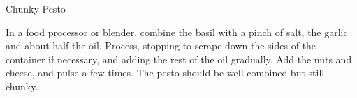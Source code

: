 \begin{recipe}{Chunky Pesto}
    \label{chunky_pesto}

    \begin{ingredients}
    \end{ingredients}

    \begin{instructions}
        In a food processor or blender, combine the basil with a pinch of salt, the garlic and about half the oil.
        Process, stopping to scrape down the sides of the container if necessary, and adding the rest of the oil gradually.
        Add the nuts and cheese, and pulse a few times.
        The pesto should be well combined but still chunky. 
    \end{instructions}
\end{recipe}
